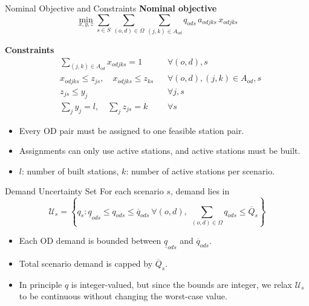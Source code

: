 \documentclass[aspectratio=169,11pt]{beamer}
\newcommand{\cU}{\mathcal{U}}
\begin{document}
\begin{frame}{Nominal Objective and Constraints}
	\small
	\textbf{Nominal objective}
	\[
		\min_{x,y,z}
		\sum_{s \in S}\sum_{(o,d)\in\Omega}\sum_{(j,k)\in A_{od}}
		q_{ods}\, a_{odjks}\, x_{odjks}
	\]

	\textbf{Constraints}
	\begin{align*}
		 & \sum_{(j,k)\in A_{od}} x_{odjks}  = 1                                   &  & \forall (o,d), s                 \\
		 & x_{odjks}                         \le z_{js},\quad x_{odjks} \le z_{ks} &  & \forall (o,d),(j,k)\in A_{od}, s \\
		 & z_{js}                            \le y_j                               &  & \forall j, s                     \\
		 & \sum_j y_j                        = l,\quad \sum_j z_{js} = k           &  & \forall s
	\end{align*}

	\begin{itemize}
		\item Every OD pair must be assigned to one feasible station pair.
		\item Assignments can only use active stations, and active stations must be built.
		\item \(l\): number of built stations, \(k\): number of active stations per scenario.
	\end{itemize}
\end{frame}

\begin{frame}{Demand Uncertainty Set}
	\small
	For each scenario \(s\), demand lies in
	\[
		\cU_s =
		\left\{
		q_s :
		\underline{q}_{ods} \le q_{ods} \le \overline{q}_{ods}\ \forall (o,d),\;
		\sum_{(o,d)\in\Omega} q_{ods} \le \overline{Q}_s
		\right\}
	\]

	\begin{itemize}
		\item Each OD demand is bounded between \(\underline{q}_{ods}\) and \(\overline{q}_{ods}\).
		\item Total scenario demand is capped by \(\overline{Q}_s\).
		\item In principle \(q\) is integer-valued, but since the bounds are integer, we relax \(\cU_s\) to be continuous without changing the worst-case value.
	\end{itemize}
\end{frame}
\end{document}
